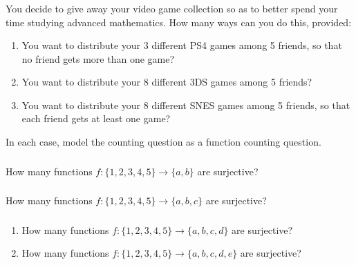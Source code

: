 \documentclass[11pt, compress]{beamer}
\begin{document}
\begin{frame}
\frametitle{}
\begin{example}[1.6.6]You decide to give away your video game collection so as to better spend your time studying advanced mathematics. How many ways can you do this, provided:\begin{enumerate}
\item{} You want to distribute your 3 different PS4 games among 5 friends, so that no friend gets more than one game?

\item{} You want to distribute your 8 different 3DS games among 5 friends?

\item{} You want to distribute your 8 different SNES games among 5 friends, so that each friend gets at least one game?
\end{enumerate}
In each case, model the counting question as a function counting question.
\end{example}
\end{frame}
 
\begin{frame}
\frametitle{}
\begin{example}[1.6.7]How many functions \(f: \{1,2,3,4,5\} \to \{a,b\}\) are surjective?
\end{example}
\end{frame}
 
\begin{frame}
\frametitle{}
\begin{example}[1.6.8]How many functions \(f: \{1,2,3,4,5\} \to \{a,b,c\}\) are surjective?
\end{example}
\end{frame}
 
\begin{frame}
\frametitle{}
\begin{example}[1.6.9]\begin{enumerate}
\item{} How many functions \(f: \{1,2,3,4,5\} \to \{a,b,c,d\}\) are surjective?


\item{} How many functions \(f: \{1,2,3,4,5\} \to \{a,b,c,d,e\}\) are surjective?

\end{enumerate}

\end{example}
\end{frame}
 
\end{document}
